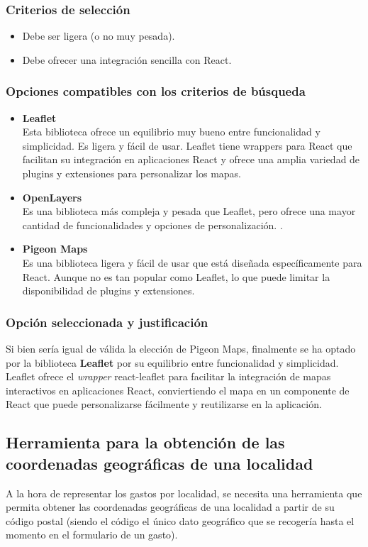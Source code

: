 \subsubsection{Criterios de selección}
\begin{itemize}
    \item Debe ser ligera (o no muy pesada).
    \item Debe ofrecer una integración sencilla con React.
\end{itemize}

\subsubsection{Opciones compatibles con los criterios de búsqueda}
\begin{itemize}
    \item \textbf{Leaflet}\\
        Esta biblioteca ofrece un equilibrio muy bueno entre funcionalidad y simplicidad. Es ligera y fácil de usar. Leaflet tiene wrappers para React que facilitan su integración en aplicaciones React y ofrece una amplia variedad de plugins y extensiones para personalizar los mapas.
    \item \textbf{OpenLayers}\\
        Es una biblioteca más compleja y pesada que Leaflet, pero ofrece una mayor cantidad de funcionalidades y opciones de personalización. .
    \item \textbf{Pigeon Maps}\\
        Es una biblioteca ligera y fácil de usar que está diseñada específicamente para React. Aunque no es tan popular como Leaflet, lo que puede limitar la disponibilidad de plugins y extensiones.
\end{itemize}

\subsubsection{Opción seleccionada y justificación}
Si bien sería igual de válida la elección de Pigeon Maps, finalmente se ha optado por la biblioteca \textbf{Leaflet} por su equilibrio entre funcionalidad y simplicidad. Leaflet ofrece el \textit{wrapper} react-leaflet para facilitar la integración de mapas interactivos en aplicaciones React, conviertiendo el mapa en un componente de React que puede personalizarse fácilmente y reutilizarse en la aplicación\cite{mappinggis_openlayers_leaflet}\cite{khan2023reactjs}.


\subsection{Herramienta para la obtención de las coordenadas geográficas de una localidad}
A la hora de representar los gastos por localidad, se necesita una herramienta que permita obtener las coordenadas geográficas de una localidad a partir de su código postal (siendo el código el único dato geográfico que se recogería hasta el momento en el formulario de un gasto). 

